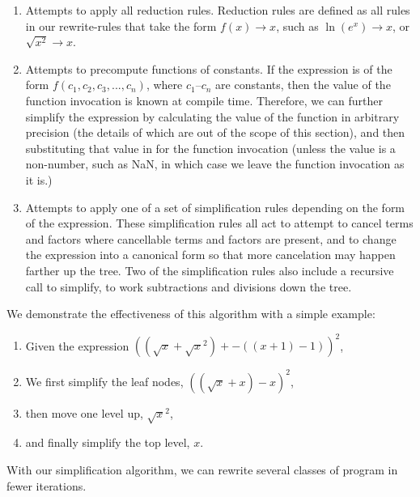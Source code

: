 \documentclass{article}
\newcommand{\lnexp}[1]{\ln{\left(e^{#1}\right)}}
\newcommand{\sqrsqrt}[1]{\sqrt{#1}^2}
\begin{document}
\begin{enumerate}
\item Attempts to apply all reduction rules. 
Reduction rules are defined as all rules 
in our rewrite-rules 
that take the form $f(x) \to x$, 
such as $\lnexp{x} \to x$, 
or $\sqrt{x^2} \to x$.

\item Attempts to precompute functions of constants. 
If the expression 
is of the form $f(c_1, c_2, c_3,..., c_n)$, 
where $c_1$--$c_n$ are constants, 
then the value of the function invocation 
is known at compile time. 
Therefore, we can further simplify the expression 
by calculating the value of the function 
in arbitrary precision 
(the details of which are out of the scope of this section), 
and then substituting that value 
in for the function invocation 
(unless the value is a non-number, 
such as NaN, 
in which case we leave the function invocation 
as it is.)

\item Attempts to apply one 
of a set of simplification rules 
depending on the form of the expression. 
These simplification rules 
all act to attempt to cancel terms and factors 
where cancellable terms and factors are present, 
and to change the expression into a canonical form 
so that more cancelation may happen 
farther up the tree. 
Two of the simplification rules 
also include a recursive call to simplify, 
to work subtractions and divisions down the tree.
\end{enumerate}

We demonstrate the effectiveness of this algorithm 
with a simple example:

\begin{enumerate}
\item Given the expression
$((\sqrt{x} + \sqrsqrt{x}) + -((x + 1) - 1))^2$,
\item We first simplify the leaf nodes,
$((\sqrt{x} + x) -x)^2$,
\item then move one level up, 
$\sqrt{x}^2$,
\item and finally simplify the top level,
$x$.
\end{enumerate}

With our simplification algorithm, 
we can rewrite several classes of program
in fewer iterations.
\end{document}
